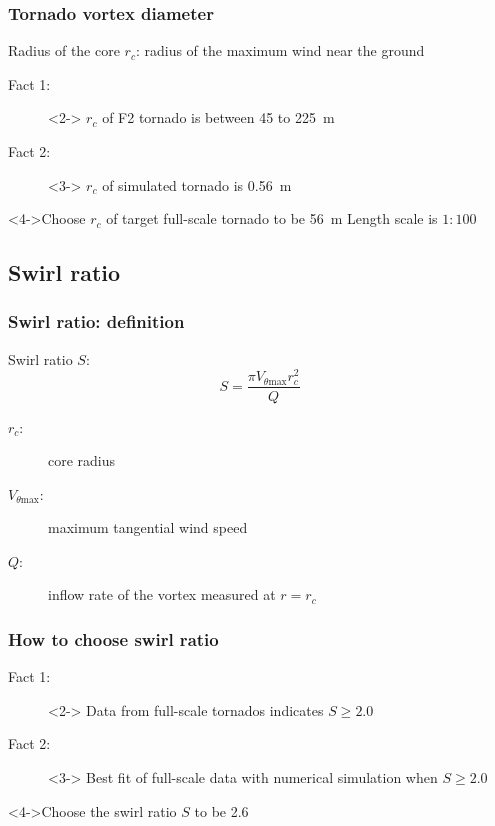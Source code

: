 \documentclass{beamer}
\begin{document}
\begin{frame}
	\frametitle{Tornado vortex diameter}
	\begin{definition}
	 	\alert{Radius of the core $r_c$}: radius of the maximum wind near the ground
	\end{definition}
	\begin{description}
		\item[Fact 1: ]<2-> $r_c$ of F2 tornado is between \alert{\SI{45}{} to \SI{225}{m}}
		\item[Fact 2: ]<3-> $r_c$ of simulated tornado is \alert{\SI{0.56}{m}}
	\end{description}
	\begin{block}<4->{Choose $r_c$ of target full-scale tornado to be \alert{\SI{56}{m}}}
		   Length scale is $1:100$ 
	\end{block} 
\end{frame}

\subsection{Swirl ratio}

\begin{frame}
	\frametitle{Swirl ratio: definition}
	\begin{definition}
		\alert{Swirl ratio $S$}: 
		$$ S = \frac{\pi V_{\theta\mathrm{max}} r_c^2}{Q}$$
		\begin{description}
			\item[$r_c$: ] core radius
			\item[$V_{\theta\mathrm{max}}$: ] maximum tangential wind speed
			\item[$Q$: ] inflow rate of the vortex measured at $r=r_c$
		\end{description}
	\end{definition}
\end{frame}

\begin{frame}
	\frametitle{How to choose swirl ratio}
		\begin{description}
			\item[Fact 1: ] <2-> Data from full-scale tornados indicates \alert{$S\geqslant2.0$}
			\item[Fact 2: ]<3-> Best fit of full-scale data with numerical simulation when \alert{$S\geqslant2.0$}
		\end{description}
		\begin{block}<4->{Choose the swirl ratio $S$  to be \alert{\num{2.6}} }
			
		\end{block}
\end{frame}
\end{document}
